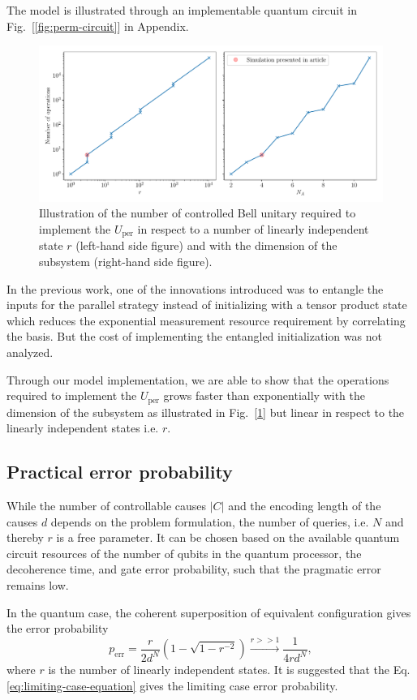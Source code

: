 \documentclass[%
 aps,
 jmp,%
 amsmath,amssymb,
 reprint,%
]{revtex4-2}
\begin{document}
The model is illustrated through an implementable quantum circuit in Fig.~[\ref{fig:perm-circuit}] in Appendix.
\begin{figure}[tbh!]
	\centering
	\includegraphics[width = 0.9\linewidth]{number_of_operations.pdf}
	\caption{Illustration of the number of controlled Bell unitary required to implement the $U_\textrm{per}$ in respect to a number of linearly independent state $r$ (left-hand side figure) and with the dimension of the subsystem (right-hand side figure).}
	\label{fig:permutation-resource}
\end{figure}
In the previous work, one of the innovations introduced was to entangle the inputs for the parallel strategy instead of initializing with a tensor product state which reduces the exponential measurement resource requirement by correlating the basis. But the cost of implementing the entangled initialization was not analyzed. 

Through our model implementation, we are able to show that the operations required to implement the $U_\textrm{per}$ grows faster than exponentially with the dimension of the subsystem as illustrated in Fig.~[\ref{fig:permutation-resource}] but linear in respect to the linearly independent states i.e. $r$.



\subsection{Practical error probability}

While the number of controllable causes $|C|$ and the encoding length of the causes $d$ depends on the problem formulation, the number of queries, i.e. $N$ and thereby $r$ is a free parameter.
It can be chosen based on the available quantum circuit resources of the number of qubits in the quantum processor, the decoherence time, and gate error probability, such that the pragmatic error remains low.

In the quantum case, the coherent superposition of equivalent configuration gives the error probability \cite{chiribella2019quantum}
\begin{equation}
p_\textrm{err} = \frac{r}{2d^N}\left( 1-\sqrt{1-r^{-2}} \right) \xrightarrow[]{r>>1}\frac{1}{4rd^N},\label{eq:limiting-case-equation}
\end{equation}
where $r$ is the number of linearly independent states.
It is suggested that the Eq.\eqref{eq:limiting-case-equation} gives the limiting case error probability. 
\end{document}
